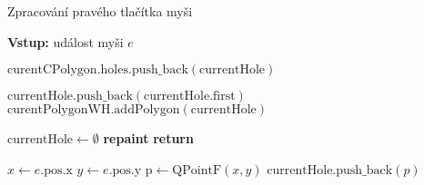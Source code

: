 \begin{algorithm}
    \caption{Zpracování pravého tlačítka myši}
    \begin{algorithmic}[1]
        \STATE \textbf{Vstup:} událost myši $e$
        
                \STATE $\text{curentCPolygon}.\text{holes}.\text{push\_back}(\text{currentHole})$
                
                \STATE $\text{currentHole}.\text{push\_back}(\text{currentHole}.\text{first})$
                \STATE $\text{curentPolygonWH}.\text{addPolygon}(\text{currentHole})$
                
                \STATE $\text{currentHole} \gets \emptyset$
            \ENDIF
            \STATE \textbf{repaint}
            \STATE \textbf{return}
        \ENDIF
        
        \STATE $x \gets e.\text{pos}.\text{x}$
        \STATE $y \gets e.\text{pos}.\text{y}$
        \STATE $\text{p} \gets \text{QPointF}(x, y)$
        \STATE $\text{currentHole}.\text{push\_back}(p)$
    \end{algorithmic}
\end{algorithm}
